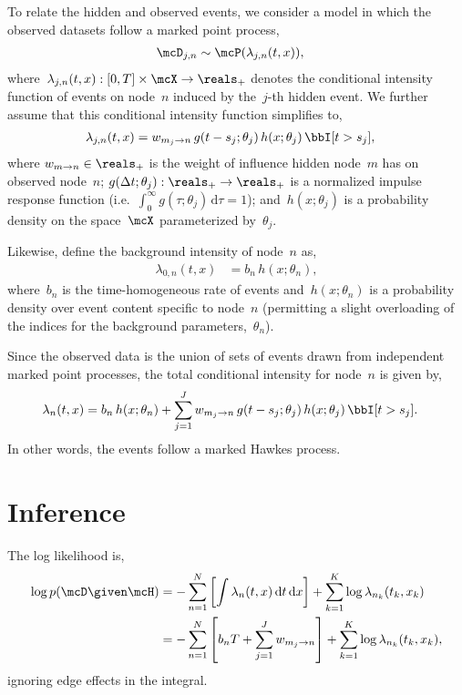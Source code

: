 To relate the hidden and observed events,
we consider a model in which the observed datasets follow a marked
point process,
\begin{align}
  \mcD_{j,n} &\sim \mcP(\lambda_{j,n}(t, x)),
\end{align}
where~$\lambda_{j,n}(t, x): [0,T] \times \mcX \to \reals_+$ denotes
the conditional intensity function of events on node~$n$ induced by
the~$j$-th hidden event.  We further assume that this conditional
intensity function simplifies to,
\begin{align}
  \lambda_{j,n}(t, x)
  &= w_{m_j \to n} \, g(t-s_j; \theta_j) \, h(x; \theta_j) \, \bbI[t > s_j],
\end{align}
where $w_{m \to n} \in \reals_+$ is the weight of influence hidden
node~$m$ has on observed node~$n$; ${g(\Delta
t; \theta_j): \reals_+ \to \reals_+}$ is a normalized impulse response
function (i.e.~$\int_0^\infty g(\tau; \theta_j) \, \mathrm{d}\tau =
1$); and~$h(x; \theta_j)$ is a probability density on the space~$\mcX$
parameterized by~$\theta_j$.

Likewise, define the background intensity of node~$n$ as,
\begin{align}
  \lambda_{0,n}(t,x) &= b_n \, h(x; \theta_n),
\end{align}
where~$b_n$ is the time-homogeneous rate of events
and~$h(x; \theta_n)$ is a probability density over event content
specific to node~$n$ (permitting a slight overloading of the indices
for the background parameters,~$\theta_n$).

Since the observed
data is the union of sets of events drawn from independent marked point processes,
the total conditional intensity for node~$n$ is given by,
\begin{align}
  \lambda_n(t, x) &= b_n \, h(x; \theta_n) + \sum_{j=1}^J w_{m_j \to n} \, g(t-s_j; \theta_j) \, h(x; \theta_j) \, \bbI[t > s_j].
\end{align}
In other words, the events follow a marked Hawkes process.


\section{Inference}
The log likelihood is,
\begin{align}
  \log p(\mcD \given \mcH) &= -\sum_{n=1}^N \left[\int \lambda_n(t,x) \, \mathrm{d}t \, \mathrm{d}x \right] + \sum_{k=1}^K \log \lambda_{n_k}(t_k, x_k) \\
  &= -\sum_{n=1}^N \left[b_n T + \sum_{j=1}^J w_{m_j \to n} \right] + \sum_{k=1}^K \log \lambda_{n_k} (t_k, x_k),
  \label{eq:loglkhd}
\end{align}
ignoring edge effects in the integral. 

